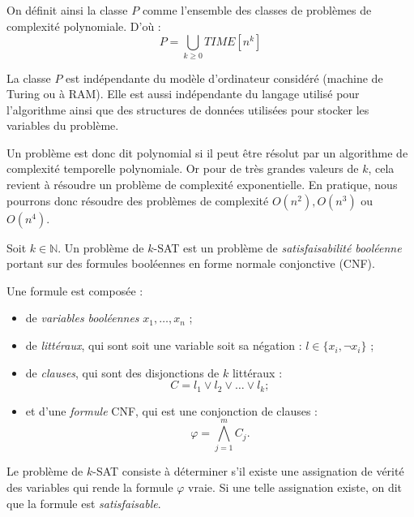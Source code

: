 \begin{definition}[Classe P]
    On définit ainsi la classe $P$ comme l'ensemble des classes de problèmes de complexité polynomiale. 
    D'où : 
        \begin{equation}
            \boxed{P = \bigcup_{k \geqslant 0} TIME[n^k] }
        \end{equation}
\end{definition}

La classe $P$ est indépendante du modèle d'ordinateur considéré (machine de Turing ou à RAM). 
Elle est aussi indépendante du langage utilisé pour l'algorithme ainsi que des structures de données 
utilisées pour stocker les variables du problème.

\begin{remark}
    Un problème est donc dit polynomial si il peut être résolut par un algorithme de complexité temporelle 
    polynomiale. Or pour de très grandes valeurs de $k$, cela revient à résoudre un problème de complexité 
    exponentielle. En pratique, nous pourrons donc résoudre des problèmes de complexité $O(n^2), O(n^3)$ ou 
    $O(n^4)$.
\end{remark}

\begin{rappel}[k-SAT]
    Soit $k \in \mathbb{N}$. Un problème de $k$-SAT est un problème de 
    \emph{satisfaisabilité booléenne} portant sur des formules booléennes en forme normale conjonctive (CNF).

    Une formule est composée :
    \begin{itemize}
        \item de \emph{variables booléennes} $x_1, \dots, x_n$ ;
        \item de \emph{littéraux}, qui sont soit une variable soit sa négation : $l \in \{x_i, \lnot x_i\}$ ;
        \item de \emph{clauses}, qui sont des disjonctions de $k$ littéraux :
        \[
            C = l_1 \vee l_2 \vee \dots \vee l_k ;
        \]
        \item et d'une \emph{formule} CNF, qui est une conjonction de clauses :
        \[
            \varphi = \bigwedge_{j = 1}^m C_j .
        \]
    \end{itemize}

    Le problème de $k$-SAT consiste à déterminer s'il existe une assignation de vérité des variables
    qui rende la formule $\varphi$ vraie. Si une telle assignation existe, on dit que la formule est
    \emph{satisfaisable}.
\end{rappel}


